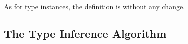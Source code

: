 As for type instances, the definition is without any change.

\subsection{The Type Inference Algorithm}





